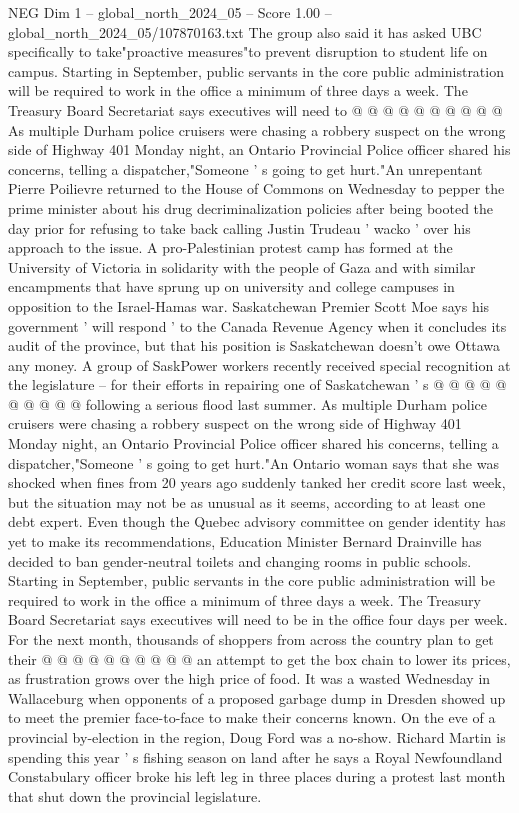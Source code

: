 \begin{textsample}{NEG Dim 1 – global\_north\_2024\_05 – Score 1.00 – global\_north\_2024\_05/107870163.txt}
The group also said it has asked UBC specifically to take"proactive measures"to prevent disruption to student life on campus.
Starting in September, public servants in the core public administration will be required to work in the office a minimum of three days a week.
The Treasury Board Secretariat says executives will need to @ @ @ @ @ @ @ @ @ @ As multiple Durham police cruisers were chasing a robbery suspect on the wrong side of Highway 401 Monday night, an Ontario Provincial Police officer shared his concerns, telling a dispatcher,"Someone ' s going to get hurt."An unrepentant Pierre Poilievre returned to the House of Commons on Wednesday to pepper the prime minister about his drug decriminalization policies after being booted the day prior for refusing to take back calling Justin Trudeau ' wacko ' over his approach to the issue.
A pro-Palestinian protest camp has formed at the University of Victoria in solidarity with the people of Gaza and with similar encampments that have sprung up on university and college campuses in opposition to the Israel-Hamas war.
Saskatchewan Premier Scott Moe says his government ' will respond ' to the Canada Revenue Agency when it concludes its audit of the province, but that his position is Saskatchewan doesn't owe Ottawa any money.
A group of SaskPower workers recently received special recognition at the legislature -- for their efforts in repairing one of Saskatchewan ' s @ @ @ @ @ @ @ @ @ @ following a serious flood last summer.
As multiple Durham police cruisers were chasing a robbery suspect on the wrong side of Highway 401 Monday night, an Ontario Provincial Police officer shared his concerns, telling a dispatcher,"Someone ' s going to get hurt."An Ontario woman says that she was shocked when fines from 20 years ago suddenly tanked her credit score last week, but the situation may not be as unusual as it seems, according to at least one debt expert.
Even though the Quebec advisory committee on gender identity has yet to make its recommendations, Education Minister Bernard Drainville has decided to ban gender-neutral toilets and changing rooms in public schools.
Starting in September, public servants in the core public administration will be required to work in the office a minimum of three days a week.
The Treasury Board Secretariat says executives will need to be in the office four days per week.
For the next month, thousands of shoppers from across the country plan to get their @ @ @ @ @ @ @ @ @ @ an attempt to get the box chain to lower its prices, as frustration grows over the high price of food.
It was a wasted Wednesday in Wallaceburg when opponents of a proposed garbage dump in Dresden showed up to meet the premier face-to-face to make their concerns known.
On the eve of a provincial by-election in the region, Doug Ford was a no-show.
Richard Martin is spending this year ' s fishing season on land after he says a Royal Newfoundland Constabulary officer broke his left leg in three places during a protest last month that shut down the provincial legislature.

\end{textsample}
